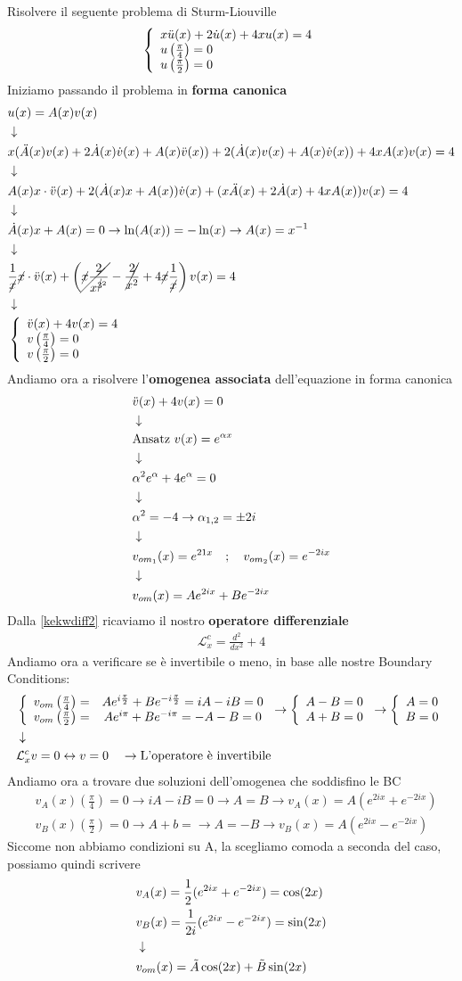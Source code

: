 Risolvere il seguente problema di Sturm-Liouville
\begin{align}
	\triple{x \ddot{u}(x) + 2 \dot{u}(x) + 4xu(x) = 4}{u \left( \frac{\pi}{4}\right)=0\hfill}{u \left( \frac{\pi}{2}\right)=0\hfill}
\end{align}
Iniziamo passando il problema in \textbf{forma canonica}
\begin{align}
	&u(x) = A(x)v(x) \firstpassage
	&x(\ddot{A}(x)v(x) + 2\dot{A}(x) \dot{v}(x) + A(x) \ddot{v}(x)) + 2(\dot{A}(x)v(x) + A(x) \dot{v}(x)) + 4xA(x)v(x) = 4 \nextpassage
	&A(x)x \cdot \ddot{v}(x) + 2(\dot{A}(x)x + A(x)) \dot{v}(x) + (x \ddot{A}(x) + 2 \dot{A}(x) + 4xA(x)) v(x) = 4 \nextpassage
	&\dot{A}(x)x + A(x)=0 \to \ln(A(x)) = -\ln(x) \to A(x)= x^{-1}\nextpassage
	&\frac{1}{\cancel{x}} \cancel{x}\cdot \ddot{v}(x) + \left( \cancel{\cancel{x} \frac{2}{x^{\cancel{3}^2}}} - \cancel{\frac{2}{x^2}} + 4\cancel{x} \frac{1}{\cancel{x}} \right)v(x) = 4 \nextpassage
	&\triple{\ddot{v}(x) + 4v(x)= 4}{v \left( \frac{\pi}{4}\right)=0\hfill}{v \left( \frac{\pi}{2}\right)=0\hfill} \label{kekwdiff2}
\end{align}
Andiamo ora a risolvere l'\textbf{omogenea associata} dell'equazione in forma canonica
\begin{align}
	&\ddot{v}(x) + 4v(x) = 0 \\ &\downarrow \nonumber \\
	&\text{Ansatz } v(x)= e^{\alpha x} \nonumber \\ &\downarrow \nonumber \\
	&\alpha^2 e^{\alpha} + 4 e^{\alpha} = 0 \nonumber \\ &\downarrow \nonumber \\
	&\alpha^2 = -4 \to \alpha_{1,2} = \pm 2i \nonumber \\ &\downarrow \nonumber \\
	&v_{{om}_1}(x) = e^{21x} \quad ; \quad v_{{om}_2}(x) = e^{-2ix} \nonumber \\ &\downarrow \nonumber \\
	&v_{{om}}(x) = Ae^{2ix} + Be^{-2ix}
\end{align}
Dalla \ref{kekwdiff2} ricaviamo il nostro \textbf{operatore differenziale}
\begin{align}
	\mathcal{L}_x^c = \frac{d^2}{dx^2} + 4
\end{align}
Andiamo ora a verificare se è invertibile o meno, in base alle nostre Boundary Conditions:
\begin{align}
	&\left\{ \begin{array}{cc} v_{om}\left( \frac{\pi}{4}\right) =& Ae^{i\frac{\pi}{2}} + Be^{-i\frac{\pi}{2}}=iA-iB = 0\\ v_{om}\left( \frac{\pi}{2}\right) =& Ae^{i\pi} + Be^{-i\pi} =-A -B = 0 \end{array} \right. \to \left\{ \begin{array}{cc} A-B=0\\ A+B=0 \end{array} \right. \to \left\{ \begin{array}{cc} A=0\\ B=0 \end{array} \right.\\ &\downarrow \nonumber \\
	&\mathcal{L}_x^c v=0 \leftrightarrow v=0 \quad \to \text{L'operatore è invertibile}
\end{align}
Andiamo ora a trovare due soluzioni dell'omogenea che soddisfino le BC
\begin{align}
	&v_A(x) \left( \frac{\pi}{4}\right) =0 \to iA - iB = 0 \to A=B \to v_A(x) = A(e^{2ix} + e^{-2ix}) \\
	&v_B(x) \left( \frac{\pi}{2}\right) =0 \to A+b = \to A=-B \to v_B(x) = A(e^{2ix} - e^{-2ix})
\end{align}
Siccome non abbiamo condizioni su A, la scegliamo comoda a seconda del caso, possiamo quindi scrivere
\begin{align}
	&v_A(x) = \frac{1}{2}(e^{2ix} + e^{-2ix}) = \cos(2x) \\
	&v_B(x) = \frac{1}{2i}(e^{2ix} - e^{-2ix}) = \sin(2x)\\ &\downarrow \nonumber \\
	& v_{om}(x) = \tilde{A} \cos(2x) + \tilde{B} \sin(2x) 
\end{align}

